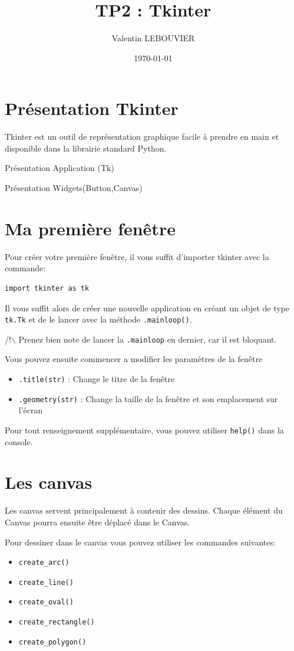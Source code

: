 \documentclass{article}
\author{Valentin LEBOUVIER}
\date{\today}
\title{TP2 : Tkinter}
\begin{document}
\maketitle


\section{Présentation Tkinter}
\label{sec-1}
Tkinter est un outil de représentation graphique facile à prendre en main et disponible dans la librairie standard Python.

Présentation Application (Tk)

Présentation Widgets(Button,Canvas)


\section{Ma première fenêtre}
\label{sec-2}
Pour créer votre première fenêtre, il vous suffit d'importer tkinter avec la commande:
\begin{verbatim}
import tkinter as tk
\end{verbatim}

Il vous suffit alors de créer une nouvelle application en créant un objet de type \verb~tk.Tk~ et de le lancer avec la méthode \verb~.mainloop()~.

\noindent
/!$\backslash$ Prenez bien note de lancer la \verb~.mainloop~ en dernier, car il est bloquant.


\noindent
Vous pouvez ensuite commencer a modifier les paramètres de la fenêtre
\begin{itemize}
\item \verb~.title(str)~ : Change le titre de la fenêtre
\item \verb~.geometry(str)~ : Change la taille de la fenêtre et son emplacement sur l'écran
\end{itemize}
\noindent
Pour tout renseignement supplémentaire, vous pouvez utiliser \verb~help()~ dans la console.

\section{Les canvas}
\label{sec-3}
Les canvas servent principalement à contenir des dessins. Chaque élément du Canvas pourra ensuite être déplacé dans le Canvas.

Pour dessiner dans le canvas vous pouvez utiliser les commandes suivantes:
\begin{itemize}
\item \verb~create_arc()~
\item \verb~create_line()~
\item \verb~create_oval()~
\item \verb~create_rectangle()~
\item \verb~create_polygon()~
\end{itemize}
\end{document}
